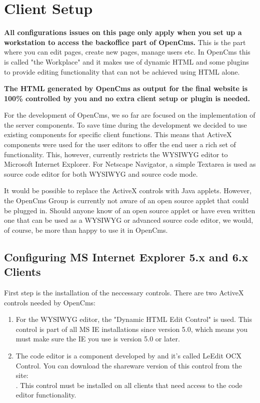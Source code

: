 \section{Client Setup}

\textbf{All configurations issues on this page only apply when you
set up a workstation to access the backoffice part of OpenCms.}
This is the part where you can edit pages, create new pages,
manage users etc. In OpenCms this is called "the Workplace" and it
makes use of dynamic HTML and some plugins to provide editing
functionality that can not be achieved using HTML alone.

\textbf{The HTML generated by OpenCms as output for the final
website is 100\% controlled by you and no extra client setup or
plugin is needed.}

For the development of OpenCms, we so far are focused on the
implementation of the server components. To save time during the
development we decided to use existing components for specific
client functions. This means that ActiveX components were used for
the user editors to offer the end user a rich set of
functionality. This, however, currently restricts the WYSIWYG
editor to Microsoft Internet Explorer. For Netscape Navigator, a
simple Textarea is used as source code editor for both WYSIWYG and
source code mode.

It would be possible to replace the ActiveX controls with Java
applets. However, the OpenCms Group is currently not aware of an
open source applet that could be plugged in. Should anyone know of
an open source applet or have even written one that can be used as
a WYSIWYG or advanced source code editor, we would, of course, be
more than happy to use it in OpenCms.


\subsection{Configuring MS Internet Explorer 5.x and 6.x Clients}

First step is the installation of the neccessary controls. There are
two ActiveX controls needed by OpenCms:

\begin{enumerate}
\item For the WYSIWYG editor, the "Dynamic HTML Edit Control" is
used. This control is part of all MS IE installations since
version 5.0, which means you must make sure the IE you use is
version 5.0 or later.
\item The code editor is a component developed by 
     and it's
called LeEdit OCX Control. You can download the shareware version
of this control from the site:\\
.
This control must be installed on all clients that need access to
the code editor functionality.
\end{enumerate}

